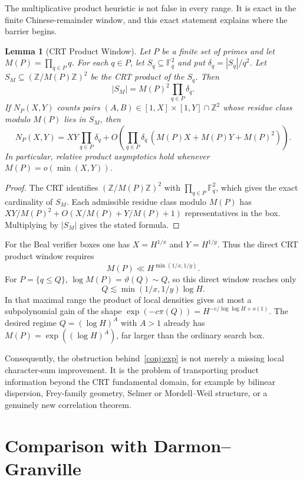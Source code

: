 \documentclass[11pt,a4paper]{article}
\newtheorem{lemma}[theorem]{Lemma}
\begin{document}
The multiplicative product heuristic is not false in every range. It is
exact in the finite Chinese-remainder window, and this exact statement
explains where the barrier begins.

\begin{lemma}[CRT Product Window]
\label{lem:crt-window}
Let $P$ be a finite set of primes and let $M(P)=\prod_{q\in P}q$.
For each $q\in P$, let $S_q\subseteq\mathbb F_q^2$ and put
$\delta_q=|S_q|/q^2$. Let $S_M\subseteq(\mathbb Z/M(P)\mathbb Z)^2$
be the CRT product of the $S_q$. Then
\[
  |S_M|=M(P)^2\prod_{q\in P}\delta_q.
\]
If $N_P(X,Y)$ counts pairs $(A,B)\in[1,X]\times[1,Y]\cap\mathbb Z^2$
whose residue class modulo $M(P)$ lies in $S_M$, then
\[
  N_P(X,Y)
  = XY\prod_{q\in P}\delta_q
    + O\!\left(\prod_{q\in P}\delta_q\,
      (M(P)X+M(P)Y+M(P)^2)\right).
\]
In particular, relative product asymptotics hold whenever
$M(P)=o(\min(X,Y))$.
\end{lemma}

\begin{proof}
The CRT identifies $(\mathbb Z/M(P)\mathbb Z)^2$ with
$\prod_{q\in P}\mathbb F_q^2$, which gives the exact cardinality of
$S_M$. Each admissible residue class modulo $M(P)$ has
$XY/M(P)^2+O(X/M(P)+Y/M(P)+1)$ representatives in the box. Multiplying
by $|S_M|$ gives the stated formula.
\end{proof}

For the Beal verifier boxes one has $X=H^{1/x}$ and $Y=H^{1/y}$.
Thus the direct CRT product window requires
\[
  M(P)\ll H^{\min(1/x,1/y)}.
\]
For $P=\{q\le Q\}$, $\log M(P)=\vartheta(Q)\sim Q$, so this direct
window reaches only
\[
  Q\lesssim \min(1/x,1/y)\log H.
\]
In that maximal range the product of local densities gives at most a
subpolynomial gain of the shape $\exp(-c\pi(Q))=H^{-c/\log\log H+o(1)}$.
The desired regime $Q=(\log H)^A$ with $A>1$ already has
$M(P)=\exp((\log H)^A)$, far larger than the ordinary search box.

Consequently, the obstruction behind~\cref{conj:exp} is not merely a
missing local character-sum improvement. It is the problem of
transporting product information beyond the CRT fundamental domain,
for example by bilinear dispersion, Frey-family geometry, Selmer or
Mordell--Weil structure, or a genuinely new correlation theorem.

\section{Comparison with Darmon--Granville}
\end{document}
